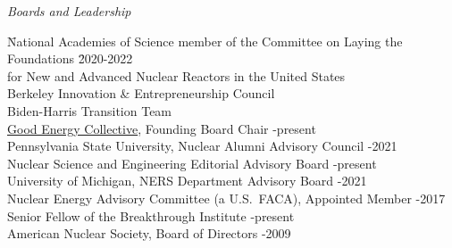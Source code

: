 \vspace*{-.25em}
\textit{Boards and Leadership}
\vspace*{-.4em}
\begin{tabbing}
\hspace*{1 em}\= National Academies of Science member of the Committee on Laying the
Foundations \hspace*{0.5em} \= 2020-2022\\
\> \hspace*{1em} for New and Advanced Nuclear Reactors in the United States\\
\> Berkeley Innovation \& Entrepreneurship Council \\
\> Biden-Harris Transition Team \\
%
\> \href{https://www.goodenergycollective.org/}{Good Energy Collective}, Founding Board Chair -present\\
%
\> Pennsylvania State University, Nuclear Alumni Advisory Council -2021\\
%
\> Nuclear Science and Engineering Editorial Advisory Board -present\\
%
\> University of Michigan, NERS Department Advisory Board -2021\\
%
%
\> Nuclear Energy Advisory Committee (a U.S.\ FACA), Appointed Member -2017 \\
%
%
\> Senior Fellow of the Breakthrough Institute -present\\
%
\> American  Nuclear Society, Board of Directors -2009
\end{tabbing}

